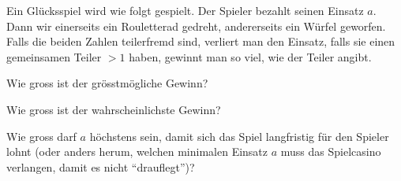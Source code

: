 Ein Glücksspiel wird wie folgt gespielt. Der Spieler bezahlt seinen
Einsatz $a$. Dann wir einerseits ein
Rouletterad gedreht, andererseits ein Würfel geworfen. Falls
die beiden Zahlen teilerfremd sind, verliert man den Einsatz, falls
sie einen gemeinsamen Teiler $>1$ haben, gewinnt man so viel, wie
der Teiler angibt.
\begin{teilaufgaben}
\item Wie gross ist der grösstmögliche Gewinn?
\item Wie gross ist der wahrscheinlichste Gewinn?
\item Wie gross darf $a$ höchstens sein, damit sich das Spiel langfristig
für den Spieler lohnt (oder anders herum, welchen minimalen Einsatz $a$
muss das Spielcasino verlangen, damit es nicht ``drauflegt'')?
\end{teilaufgaben}


